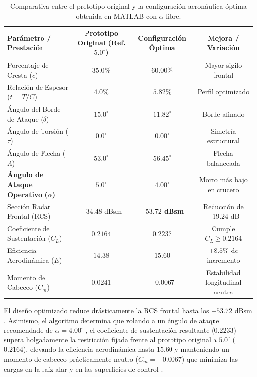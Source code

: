 \documentclass[11pt, a4paper]{article}
\begin{document}
\begin{table}[h]
\centering
\caption{Comparativa entre el prototipo original y la configuración aeronáutica óptima obtenida en MATLAB con $\alpha$ libre.}
\label{tab:resultados}
\begin{tabular}{lccc}
\toprule
\textbf{Parámetro / Prestación} & \textbf{Prototipo Original (Ref. $5.0^\circ$)} & \textbf{Configuración Óptima} & \textbf{Mejora / Variación} \\
\midrule
Porcentaje de Cresta ($c$) & $35.0\%$ & $60.00\%$ & Mayor sigilo frontal \cite{anderson} \\
Relación de Espesor ($t = T/C$) & $4.0\%$ & $5.82\%$ & Perfil optimizado \cite{anderson} \\
Ángulo del Borde de Ataque ($\delta$) & $15.0^\circ$ & $11.82^\circ$ & Borde afinado \cite{anderson} \\
Ángulo de Torsión ($\tau$) & $0.0^\circ$ & $0.00^\circ$ & Simetría estructural \cite{anderson} \\
Ángulo de Flecha ($\Lambda$) & $53.0^\circ$ & $56.45^\circ$ & Flecha balanceada \cite{anderson} \\
\midrule
\textbf{Ángulo de Ataque Operativo ($\alpha$)} & $5.0^\circ$ & \textbf{$4.00^\circ$} & Morro más bajo en crucero \cite{anderson} \\
Sección Radar Frontal (RCS) & $-34.48$ dBsm & \textbf{$-53.72$ dBsm} & Reducción de $-19.24$ dB \cite{anderson} \\
Coeficiente de Sustentación ($C_L$) & $0.2164$ & \textbf{$0.2233$} & Cumple $C_L \ge 0.2164$ \cite{raymer, anderson} \\
Eficiencia Aerodinámica ($E$) & $14.38$ & \textbf{$15.60$} & $+8.5\%$ de incremento \cite{anderson} \\
Momento de Cabeceo ($C_m$) & $0.0241$ & \textbf{$-0.0067$} & Estabilidad longitudinal neutra \cite{anderson} \\
\bottomrule
\end{tabular}
\end{table}

El diseño optimizado reduce drásticamente la RCS frontal hasta los $-53.72$ dBsm \cite{anderson}. Asimismo, el algoritmo determina que volando a un ángulo de ataque recomendado de $\alpha = 4.00^\circ$ \cite{anderson}, el coeficiente de sustentación resultante ($0.2233$) supera holgadamente la restricción fijada frente al prototipo original a $5.0^\circ$ ($0.2164$), elevando la eficiencia aerodinámica hasta $15.60$ y manteniendo un momento de cabeceo prácticamente neutro ($C_m = -0.0067$) que minimiza las cargas en la raíz alar y en las superficies de control \cite{anderson}.
\end{document}
